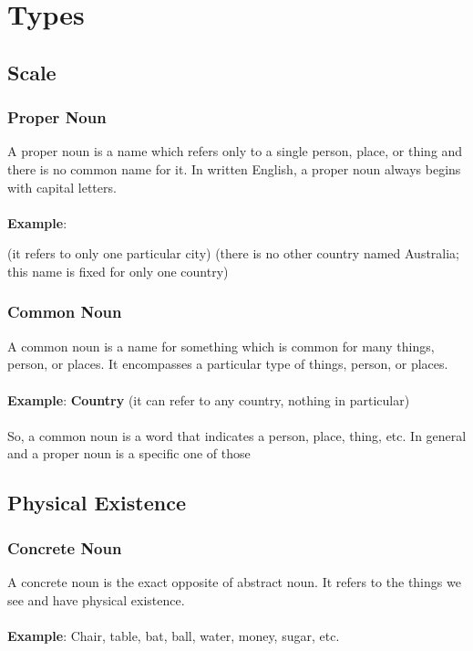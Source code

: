 \chapter{Types}
\section{Scale}
\subsection{Proper Noun}
A proper noun is a name which refers only to a single person, place,
or thing and there is no common name for it.
In written English, a proper noun always begins with capital letters.\\\\
\textbf{Example}:
\begin{itemize}
     (it refers to only one particular city)
     (there is no other country named Australia; this name is fixed for only one country)
\end{itemize}

\subsection{Common Noun}
A common noun is a name for something which is common for many things, person, or places. It encompasses a particular type of things, person, or places.\\\\
\textbf{Example}: \textbf{Country} (it can refer to any country, nothing in particular)\\\\
So, a common noun is a word that indicates a person, place, thing, etc. In general and a proper noun is a specific one of those

\newpage
\section{Physical Existence}
\subsection{Concrete Noun}
A concrete noun is the exact opposite of abstract noun. It refers to the things we see and have physical existence.\\\\
\textbf{Example}: Chair, table, bat, ball, water, money, sugar, etc.

